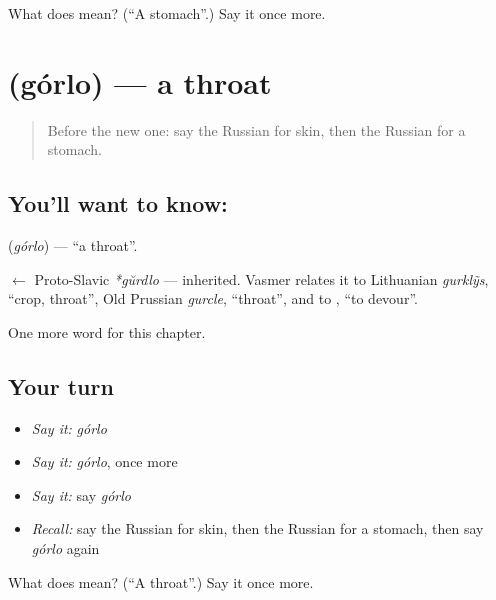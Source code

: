 \begin{tcolorbox}[breakable,colback=teal!4,colframe=teal!35!black,title={Before you move on}]
What does  mean? (\textquotedblleft{}A stomach\textquotedblright{}.) Say it once more.
\end{tcolorbox}
\section[\texorpdfstring{\ru{горло} (górlo)}{горло (górlo)}]{ (górlo) — a throat}

\label{lesson:RU-C121-throat}



\begin{quote}
Before the new one: say the Russian for skin, then the Russian for a stomach.
\end{quote}

\subsection*{You'll want to know: }
\textbf{} (\emph{górlo}) — \textquotedblleft{}a throat\textquotedblright{}.

\begin{cousinweb}
\textbf{} $\leftarrow$ Proto-Slavic \emph{*gŭrdlo} — inherited. Vasmer relates it to Lithuanian \emph{gurklỹs}, \textquotedblleft{}crop, throat\textquotedblright{}, Old Prussian \emph{gurcle}, \textquotedblleft{}throat\textquotedblright{}, and to \emph{}, \textquotedblleft{}to devour\textquotedblright{}.
\end{cousinweb}

\begin{grammarlens}[title={What you've built}]
One more word for this chapter.
\end{grammarlens}

\subsection*{Your turn}
\begin{itemize}
\raggedright
  \item \emph{Say it:} \emph{górlo}
  \item \emph{Say it:} \emph{górlo}, once more
  \item \emph{Say it:} say \emph{górlo}
  \item \emph{Recall:} say the Russian for skin, then the Russian for a stomach, then say \emph{górlo} again
\end{itemize}

\begin{tcolorbox}[breakable,colback=teal!4,colframe=teal!35!black,title={Before you move on}]
What does  mean? (\textquotedblleft{}A throat\textquotedblright{}.) Say it once more.
\end{tcolorbox}
